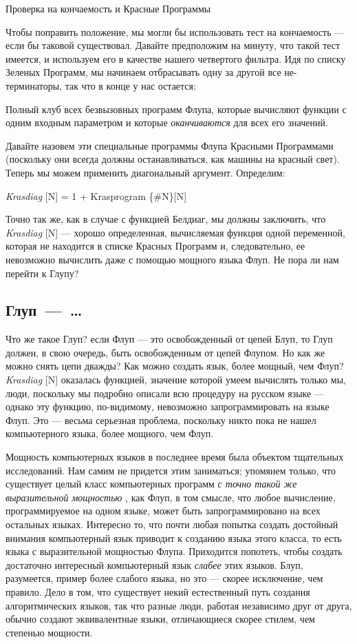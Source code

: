 \documentclass[../main.tex]{subfiles}
\begin{document}
Проверка на кончаемость и Красные Программы

Чтобы поправить положение, мы могли бы использовать тест на кончаемость --- если бы таковой существовал. Давайте предположим на минуту, что такой тест имеется, и используем его в качестве нашего четвертого фильтра. Идя по списку Зеленых Программ, мы начинаем отбрасывать одну за другой все не-терминаторы, так что в конце у нас остается:

Полный клуб всех безвызовных программ Флупа, которые вычисляют функции с одним входным параметром и которые \emph{оканчиваются} для всех его значений.

Давайте назовем эти специальные программы Флупа Красными Программами (поскольку они всегда должны останавливаться, как машины на красный свет). Теперь мы можем применить диагональный аргумент. Определим:

\emph{Krasdiag} {[}N{]} = 1 + Krasprogram \{\#N\}{[}N{]}

Точно так же, как в случае с функцией Белдиаг, мы должны заключить, что \emph{Krasdiag} {[}N{]} --- хорошо определенная, вычисляемая функция одной переменной, которая не находится в списке Красных Программ и, следовательно, ее невозможно вычислить даже с помощью мощного языка Флуп. Не пора ли нам перейти к Глупу?


\subsection{Глуп~---~\ldots{}}

Что же такое Глуп? если Флуп --- это освобожденный от цепей Блуп, то Глуп должен, в свою очередь, быть освобожденным от цепей Флупом. Но как же можно снять цепи дважды? Как можно создать язык, более мощный, чем Флуп? \emph{Krasdiag} {[}N{]} оказалась функцией, значение которой умеем вычислять только мы, люди, поскольку мы подробно описали всю процедуру на русском языке --- однако эту функцию, по-видимому, невозможно запрограммировать на языке Флуп. Это --- весьма серьезная проблема, поскольку никто пока не нашел компьютерного языка, более мощного, чем Флуп.

Мощность компьютерных языков в последнее время была объектом тщательных исследований. Нам самим не придется этим заниматься; упомянем только, что существует целый класс компьютерных программ \emph{с точно такой же выразительной мощностью} , как Флуп, в том смысле, что любое вычисление, программируемое на одном языке, может быть запрограммировано на всех остальных языках. Интересно то, что почти любая попытка создать достойный внимания компьютерный язык приводит к созданию языка этого класса, то есть языка с выразительной мощностью Флупа. Приходится попотеть, чтобы создать достаточно интересный компьютерный язык \emph{слабее} этих языков. Блуп, разумеется, пример более слабого языка, но это --- скорее исключение, чем правило. Дело в том, что существует некий естественный путь создания алгоритмических языков, так что разные люди, работая независимо друг от друга, обычно создают эквивалентные языки, отличающиеся скорее стилем, чем степенью мощности.
\end{document}
